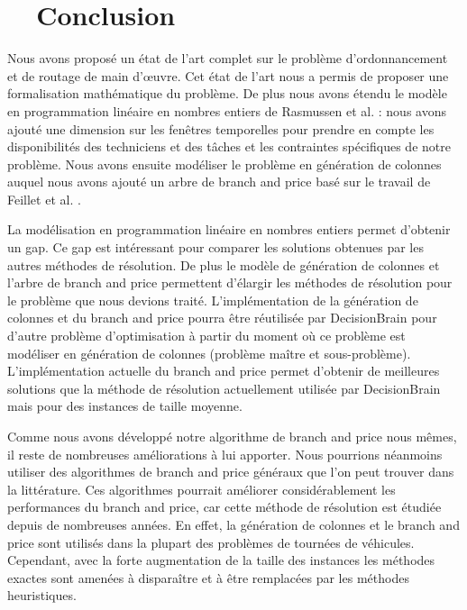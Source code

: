\chapter*{~~Conclusion}
Nous avons proposé un état de l'art complet sur le problème d'ordonnancement et de routage de main d'\oe uvre.
Cet état de l'art nous a permis de proposer une formalisation mathématique du problème.
De plus nous avons étendu le modèle en programmation linéaire en nombres entiers de Rasmussen et al. \cite{Rasmussen2010} : nous avons ajouté une dimension sur les fenêtres temporelles pour prendre en compte les disponibilités des techniciens et des tâches et les contraintes spécifiques de notre problème. Nous avons ensuite modéliser le problème en génération de colonnes auquel nous avons ajouté un arbre de branch and price basé sur le travail de Feillet et al. \cite{feillet2010}.

La modélisation en programmation linéaire en nombres entiers permet d'obtenir un gap. Ce gap est intéressant pour comparer les solutions obtenues par les autres méthodes de résolution.
De plus le modèle de génération de colonnes et l'arbre de branch and price permettent d'élargir les méthodes de résolution pour le problème que nous devions traité.
L'implémentation de la génération de colonnes et du branch and price pourra être réutilisée par DecisionBrain pour d'autre problème d'optimisation à partir du moment où ce problème est modéliser en génération de colonnes (problème maître et sous-problème).
L'implémentation actuelle du branch and price  permet  d'obtenir de meilleures solutions que la méthode de résolution actuellement utilisée par DecisionBrain mais pour des instances de taille moyenne.

Comme nous avons développé notre algorithme de branch and price nous mêmes, il reste de nombreuses améliorations à lui apporter.
Nous pourrions néanmoins utiliser des algorithmes de branch and price généraux que l'on peut trouver dans la littérature.
Ces algorithmes pourrait améliorer considérablement les performances du branch and price, car cette méthode de résolution est étudiée depuis de nombreuses années.
En effet, la génération de colonnes et le branch and price sont utilisés dans la plupart des problèmes de tournées de véhicules.
Cependant, avec la forte augmentation de la taille des instances les méthodes exactes sont amenées à disparaître et à être remplacées par les méthodes heuristiques. 

